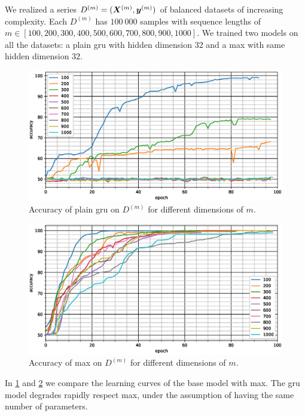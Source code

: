 We realized a series
$D^{(m)}=(\bm{X}^{(m)},\bm{y}^{(m)})$ of balanced
datasets of increasing complexity. Each $D^{(m)}$ has $100\ 000$
samples with 
sequence lengths of $m\in
[100,200,300,400,500,600,700,800,900,1000]$. We trained two models on
all the datasets: a plain \ac{gru} with hidden dimension $32$ and a
\ac{max} with same hidden dimension $32$. 

\begin{figure}
  \centering
  \includegraphics[width=\floatwidth]{imgMax/accuracy-base.eps}
  \caption{Accuracy of plain \ac{gru} on $D^{(m)}$ for different dimensions of $m$.}
  \label{fig:testAccBase}
\end{figure}

\begin{figure}
  \centering
  \includegraphics[width=\floatwidth]{imgMax/accuracy-max.eps}
  \caption{Accuracy of \ac{max} on $D^{(m)}$ for different dimensions of $m$.}
  \label{fig:testAccMax}
\end{figure}

In \cref{fig:testAccBase} and \cref{fig:testAccMax} we compare
the learning curves of the base model with \ac{max}. The \ac{gru}
model degrades rapidly respect \ac{max}, under the assumption of
having the same number of parameters.

